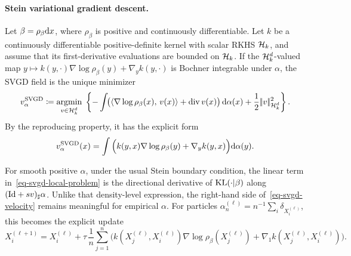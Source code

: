 \paragraph{Stein variational gradient descent.}\label{sec-svgd-generative-flow}
\begin{defn}\label{def-svgd-vector-field}
Let $\beta=\rho_\beta\mathrm{d} x$, where $\rho_\beta$ is positive and continuously differentiable. Let $k$ be a continuously differentiable positive-definite kernel with scalar RKHS $\mathcal{H}_k$, and assume that its first-derivative evaluations are bounded on $\mathcal{H}_k$. If the $\mathcal{H}_k^d$-valued map $y\mapsto k(y,\cdot)\nabla\log\rho_\beta(y)+\nabla_yk(y,\cdot)$ is Bochner integrable under $\alpha$, the SVGD field is the unique minimizer
\begin{equation}\label{eq-svgd-local-problem}
v_\alpha^{\mathrm{SVGD}}
\coloneqq
\underset{v\in\mathcal{H}_k^d}{\operatorname{argmin}}\;
\left\{
-\int\!\bigl(\langle \nabla\log\rho_\beta(x),\,v(x)\rangle+\operatorname{div} v(x)\bigr)\,\mathrm{d}\alpha(x)
+\frac12|\!| v |\!|_{\mathcal{H}_k^d}^2
\right\}.
\end{equation}
By the reproducing property, it has the explicit form
\begin{equation}\label{eq-svgd-velocity}
v_{\alpha}^{\mathrm{SVGD}}(x)
=
\int
\Big(k(y,x)\nabla\log\rho_\beta(y)+\nabla_y k(y,x)\Big)
\mathrm{d}\alpha(y).
\end{equation}
\end{defn}
For smooth positive $\alpha$, under the usual Stein boundary condition, the linear term in~\eqref{eq-svgd-local-problem} is the directional derivative of $\operatorname{KL}(\cdot|\beta)$ along $(\mathrm{Id}+s v)_\sharp\alpha$. Unlike that density-level expression, the right-hand side of~\eqref{eq-svgd-velocity} remains meaningful for empirical $\alpha$.
For particles $\alpha_n^{(\ell)}=n^{-1}\sum_i\delta_{X_i^{(\ell)}}$, this becomes the explicit update
\begin{equation}\label{eq-svgd-particle-update}
X_i^{(\ell+1)}
=
X_i^{(\ell)}
+
\tau\,\frac{1}{n}\sum_{j=1}^n
\Big(k(X_j^{(\ell)},X_i^{(\ell)})\nabla\log\rho_\beta(X_j^{(\ell)})
+
\nabla_1k(X_j^{(\ell)},X_i^{(\ell)})\Big).
\end{equation}
